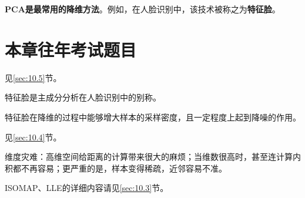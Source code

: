 \textbf{PCA是最常用的降维方法}。例如，在人脸识别中，该技术被称之为\textbf{特征脸}。

\section{本章往年考试题目}\label{sec:10.6}

见\ref{sec:10.5}节。

特征脸是主成分分析在人脸识别中的别称。

特征脸在降维的过程中能够增大样本的采样密度，且一定程度上起到降噪的作用。

见\ref{sec:10.4}节。

维度灾难：高维空间给距离的计算带来很大的麻烦；当维数很高时，甚至连计算内积都不再容易；更严重的是，样本变得稀疏，近邻容易不准。

ISOMAP、LLE的详细内容请见\ref{sec:10.3}节。